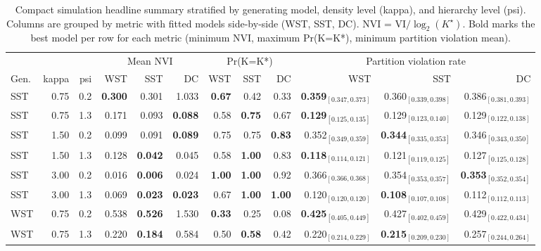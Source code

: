 \begin{table}[!h]
\centering
\caption{Compact simulation headline summary stratified by generating model, density level (kappa), and hierarchy level (psi). Columns are grouped by metric with fitted models side-by-side (WST, SST, DC). NVI = VI$/\log_2(K^\star)$. Bold marks the best model per row for each metric (minimum NVI, maximum Pr(K=K*), minimum partition violation mean).\\\label{tab:sim-headline-compact}}
\centering
\begin{tabular}[t]{lrrrrrrrrrrr}
\toprule
\multicolumn{3}{c}{ } & \multicolumn{3}{c}{Mean NVI} & \multicolumn{3}{c}{Pr(K=K*)} & \multicolumn{3}{c}{Partition violation rate} \\
\cmidrule(l{3pt}r{3pt}){4-6} \cmidrule(l{3pt}r{3pt}){7-9} \cmidrule(l{3pt}r{3pt}){10-12}
Gen. & kappa & psi & WST & SST & DC & WST & SST & DC & WST & SST & DC\\
\midrule
SST & 0.75 & 0.2 & \textbf{0.300} & 0.301 & 1.033 & \textbf{0.67} & 0.42 & 0.33 & \textbf{0.359$_{[0.347,0.373]}$} & 0.360$_{[0.339,0.398]}$ & 0.386$_{[0.381,0.393]}$\\
SST & 0.75 & 1.3 & 0.171 & 0.093 & \textbf{0.088} & 0.58 & \textbf{0.75} & 0.67 & \textbf{0.129$_{[0.125,0.135]}$} & 0.129$_{[0.123,0.140]}$ & 0.129$_{[0.122,0.138]}$\\
SST & 1.50 & 0.2 & 0.099 & 0.091 & \textbf{0.089} & 0.75 & 0.75 & \textbf{0.83} & 0.352$_{[0.349,0.359]}$ & \textbf{0.344$_{[0.335,0.353]}$} & 0.346$_{[0.343,0.350]}$\\
SST & 1.50 & 1.3 & 0.128 & \textbf{0.042} & 0.045 & 0.58 & \textbf{1.00} & 0.83 & \textbf{0.118$_{[0.114,0.121]}$} & 0.121$_{[0.119,0.125]}$ & 0.127$_{[0.125,0.128]}$\\
SST & 3.00 & 0.2 & 0.016 & \textbf{0.006} & 0.024 & \textbf{1.00} & \textbf{1.00} & 0.92 & 0.366$_{[0.366,0.368]}$ & 0.354$_{[0.353,0.357]}$ & \textbf{0.353$_{[0.352,0.354]}$}\\
SST & 3.00 & 1.3 & 0.069 & \textbf{0.023} & \textbf{0.023} & 0.67 & \textbf{1.00} & \textbf{1.00} & 0.120$_{[0.120,0.120]}$ & \textbf{0.108$_{[0.107,0.108]}$} & 0.112$_{[0.112,0.113]}$\\
WST & 0.75 & 0.2 & 0.538 & \textbf{0.526} & 1.530 & \textbf{0.33} & 0.25 & 0.08 & \textbf{0.425$_{[0.405,0.449]}$} & 0.427$_{[0.402,0.459]}$ & 0.429$_{[0.422,0.434]}$\\
WST & 0.75 & 1.3 & 0.220 & \textbf{0.184} & 0.584 & 0.50 & \textbf{0.58} & 0.42 & 0.220$_{[0.214,0.229]}$ & \textbf{0.215$_{[0.209,0.230]}$} & 0.257$_{[0.244,0.264]}$\\

\end{tabular}
\end{table}
